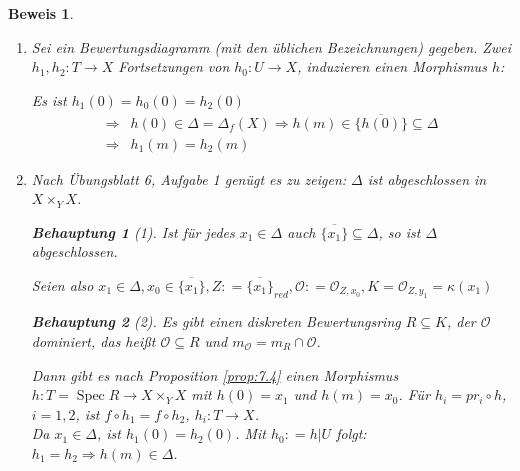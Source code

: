 \documentclass[a4paper,oneside]{scrbook}
\theoremstyle{break}
\theoremstyle{nonumberbreak}
\newtheorem{Beh}{Behauptung}
\theoremstyle{nonumberplain}
\newtheorem{Bew}{Beweis}
\theoremstyle{break}
\newcommand{\defeqr}[0]{\mathrel{\mathop:}=}
\newcommand{\Spec}{%
	\ensuremath{\operatorname{Spec}}%
}
\begin{document}
\begin{Bew}
  \begin{enumerate}
  \item[``$\Rightarrow$'']
    Sei ein Bewertungsdiagramm (mit den üblichen Bezeichnungen) gegeben. Zwei $h_1,h_2:T\to X$ Fortsetzungen von
    $h_0:U\to X$, induzieren einen Morphismus $h$:
    \begin{center}
    \end{center}
    Es ist $h_1(0)=h_0(0)=h_2(0)$
    \begin{align*}
      \Rightarrow & h(0)\in\Delta=\Delta_f(X) \Rightarrow h(m)\in\overline{\{h(0)\}}\subseteq\Delta \\
      \Rightarrow & h_1(m)=h_2(m)
    \end{align*}
  \item[``$\Leftarrow$''] Nach Übungsblatt 6, Aufgabe 1 genügt es zu zeigen: $\Delta$ ist abgeschlossen in $X\times_Y X$.
    \begin{Beh}[1]
      Ist für jedes $x_1\in\Delta$ auch $\overline{\{x_1\}}\subseteq\Delta$, so ist $\Delta$ abgeschlossen.
    \end{Beh}
    Seien also $x_1\in\Delta, x_0\in\overline{\{x_1\}}, Z\defeqr\overline{\{x_1\}}_{red}, \mathcal O\defeqr\mathcal O_{Z,x_0}, K=\mathcal O_{Z,y_1}=\kappa(x_1)$
    \begin{Beh}[2]
      Es gibt einen diskreten Bewertungsring $R\subseteq K$, der $\mathcal O$ dominiert, das heißt $\mathcal O\subseteq R$ 
      und $m_{\mathcal O}=m_R\cap\mathcal O$.
    \end{Beh}
    Dann gibt es nach Proposition \ref{prop:7.4} einen Morphismus $h:T=\Spec R\to X\times_Y X$ mit $h(0)=x_1$ und $h(m)=x_0$.
    Für $h_i=pr_i\circ h$, $i=1,2$, ist $f\circ h_1=f\circ h_2$, $h_i:T\to X$. \\
    Da $x_1\in \Delta$, ist $h_1(0)=h_2(0)$. Mit $h_0\defeqr h\vert U$ folgt: $h_1=h_2\Rightarrow h(m)\in\Delta$.
  \end{enumerate}
\end{Bew}
\end{document}
